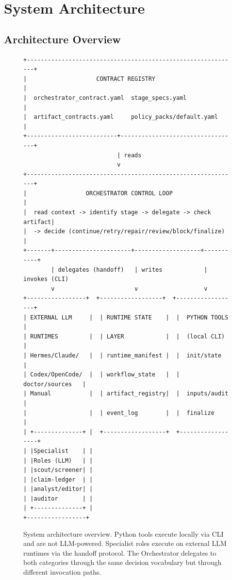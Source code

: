 \documentclass[11pt,a4paper]{article}
\begin{document}
\section{System Architecture}
\label{sec:architecture}

\subsection{Architecture Overview}

\begin{figure}[ht]
\centering
\begin{lstlisting}[basicstyle=\scriptsize\ttfamily,frame=none,backgroundcolor={},aboveskip=0pt,belowskip=0pt]
+-------------------------------------------------------------+
|                    CONTRACT REGISTRY                         |
|  orchestrator_contract.yaml  stage_specs.yaml                |
|  artifact_contracts.yaml     policy_packs/default.yaml       |
+--------------------------+----------------------------------+
                           | reads
                           v
+-------------------------------------------------------------+
|                 ORCHESTRATOR CONTROL LOOP                    |
|  read context -> identify stage -> delegate -> check artifact|
|  -> decide (continue/retry/repair/review/block/finalize)    |
+-------+----------------------+-------------------+-----------+
        | delegates (handoff)   | writes            | invokes (CLI)
        v                       v                   v
+-----------------+  +------------------+  +------------------+
| EXTERNAL LLM     |  | RUNTIME STATE    |  |  PYTHON TOOLS     |
| RUNTIMES         |  | LAYER            |  |  (local CLI)      |
| Hermes/Claude/   |  | runtime_manifest |  |  init/state       |
| Codex/OpenCode/  |  | workflow_state   |  |  doctor/sources   |
| Manual           |  | artifact_registry|  |  inputs/audit     |
|                  |  | event_log        |  |  finalize         |
| +--------------+ |  +------------------+  +------------------+
| |Specialist    | |
| |Roles (LLM)   | |
| |scout/screener| |
| |claim-ledger  | |
| |analyst/editor| |
| |auditor       | |
| +--------------+ |
+-----------------+
\end{lstlisting}
\vspace{-6pt}
\caption{System architecture overview. Python tools execute locally via CLI and are not LLM-powered. Specialist roles execute on external LLM runtimes via the handoff protocol. The Orchestrator delegates to both categories through the same decision vocabulary but through different invocation paths.}
\label{fig:arch}
\end{figure}
\end{document}
